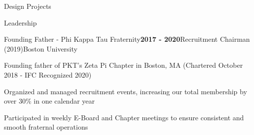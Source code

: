 \documentclass{resume} %
\begin{document}
\begin{rSection}{Design Projects}
	
	
	
	
\end{rSection}

\begin{rSection}{Leadership}
	
	\begin{rSubsection}{Founding Father - Phi Kappa Tau Fraternity}{\bf 2017 - 2020}{Recruitment Chairman (2019)}{Boston University}
		\item Founding father of PKT's Zeta Pi Chapter in Boston, MA (Chartered October 2018 - IFC Recognized 2020)
		\item Organized and managed recruitment events, increasing our total membership by over  30\% in one calendar year
		\item Participated in weekly E-Board and Chapter meetings to ensure consistent and smooth fraternal operations
	\end{rSubsection}
	
\end{rSection}
\end{document}
